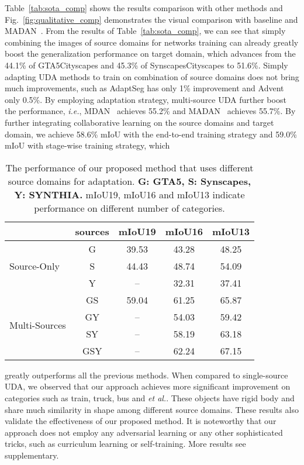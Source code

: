 \documentclass[final]{cvpr}
\def\etal{\textit{et al.}}
\def\ie{\textit{i.e.}}
\begin{document}
Table~\ref{tab:sota_comp} shows the results comparison with other methods and Fig.~\ref{fig:qualitative_comp} demonstrates the visual comparison with baseline and MADAN~\cite{zhao2019multi}.
From the results of Table~\ref{tab:sota_comp}, we can see that simply combining the images of source domains for networks training can already greatly boost the generalization performance on target domain, which advances from the 44.1\% of GTA5Cityscapes and 45.3\% of SynscapesCityscapes to 51.6\%. Simply adapting UDA methods to train on combination of source domains does not bring much improvements, such as AdaptSeg has only 1\% improvement and Advent only 0.5\%. By employing adaptation strategy, multi-source UDA further boost the performance, \ie, MDAN~\cite{zhao2018adversarial} achieves 55.2\% and MADAN~\cite{zhao2019multi} achieves 55.7\%. By further integrating collaborative learning on the source domains and target domain, we achieve 58.6\% mIoU with the end-to-end training strategy and 59.0\% mIoU with stage-wise training strategy, which
\begin{table}[t]
	\centering
	\caption{The performance of our proposed method that uses different source domains for adaptation. \textbf{G: GTA5, S: Synscapes, Y: SYNTHIA.} mIoU19, mIoU16 and mIoU13 indicate performance on different number of categories.}
	\label{tab:multi-source}
	\vspace{1mm}
	\setlength{\tabcolsep}{1.2mm}
	\begin{tabular}{l|c|ccc}
		\hline
		& sources & mIoU19 & mIoU16 & mIoU13 \\
		\hline
		\multirow{3}{*}{Source-Only} & G & 39.53 & 43.28 & 48.25 \\
		& S & 44.43 & 48.74 & 54.09 \\
		& Y & -- & 32.31 & 37.41 \\
		\hline
		\multirow{4}{*}{Multi-Sources} & GS & 59.04 & 61.25 & 65.87 \\
		& GY & -- &  54.03 & 59.42\\
		& SY & -- & 58.19 & 63.18 \\
		& GSY & -- & 62.24 & 67.15  \\
		\hline
	\end{tabular}
	\vspace{-8pt}
\end{table}
greatly outperforms all the previous methods. When compared to single-source UDA, we observed that our approach achieves more significant improvement on categories such as train, truck, bus and \etal. These objects have rigid body and share much similarity in shape among different source domains. These results also validate the effectiveness of our proposed method. It is noteworthy that our approach does not employ any adversarial learning or any other sophisticated tricks, such as curriculum learning or self-training. More results see supplementary.
\end{document}
